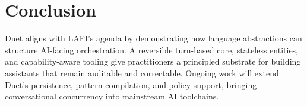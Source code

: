 \documentclass[sigplan,screen]{acmart}
\begin{document}
\section{Conclusion}
Duet aligns with LAFI's agenda by demonstrating how language abstractions can
structure AI-facing orchestration. A reversible turn-based core, stateless
entities, and capability-aware tooling give practitioners a principled substrate
for building assistants that remain auditable and correctable. Ongoing work will
extend Duet's persistence, pattern compilation, and policy support, bringing
conversational concurrency into mainstream AI toolchains.



\end{document}
